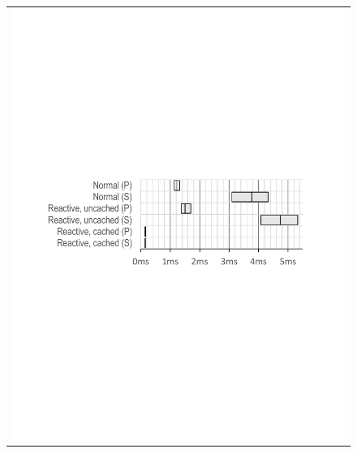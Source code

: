 \begin{figure}
\centering
\begin{tabular}{@{}c@{}}
\includegraphics[width=\columnwidth, viewport=67 322 534 477]{figs/query-latencies}\\[.2in]

\end{tabular}
\end{figure}
